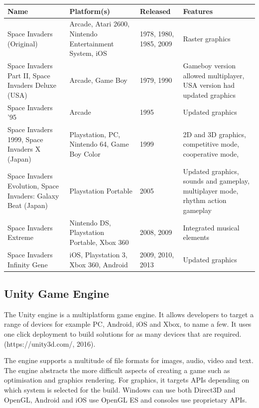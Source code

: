 \documentclass[12pt]{article}
\begin{document}
\begin{center}
    \begin{tabular}{ | p{2.25cm} | p{2.5cm} | p{4.5cm} | p{4cm} |} \hline
    Name & Platform(s) & Released & Features \\ \hline
    Space Invaders (Original) & Arcade, Atari 2600, Nintendo Entertainment System, iOS & 1978, 1980, 1985, 2009 & Raster graphics \\ \hline
    
    Space Invaders Part II, Space Invaders Deluxe (USA) & Arcade, Game Boy & 1979, 1990 & Gameboy version allowed multiplayer, USA version had updated graphics\\ \hline
    
    Space Invaders '95 & Arcade & 1995 & Updated graphics  \\ \hline
    
	Space Invaders 1999, Space Invaders X (Japan) & Playstation, PC, Nintendo 64, Game Boy Color & 1999 & 2D and 3D graphics, competitive mode, cooperative mode,   \\ \hline 
	
	Space Invaders Evolution, Space Invaders: Galaxy Beat (Japan) & Playstation Portable & 2005 & Updated graphics, sounds and gameplay, multiplayer mode, rhythm action gameplay \\ \hline
	
	Space Invaders Extreme & Nintendo DS, Playstation Portable, Xbox 360 & 2008, 2009 & Integrated musical elements \\ \hline
	
	Space Invaders Infinity Gene & iOS, Playstation 3, Xbox 360, Android & 2009, 2010, 2013 & Updated graphics\\ \hline
    \end{tabular}
\end{center}

\newpage
\begin{center}
\subsection{Unity Game Engine}
\end{center}
The Unity engine is a multiplatform game engine. It allows developers to target a range of devices for example PC, Android, iOS and Xbox, to name a few. It uses one click deployment to build solutions for as many devices that are required. (https://unity3d.com/, 2016).

The engine supports a multitude of file formats for images, audio, video and text. The engine abstracts the more difficult aspects of creating a game such as optimisation and graphics rendering. For graphics, it targets APIs depending on which system is selected for the build. Windows can use both Direct3D and OpenGL, Android and iOS use OpenGL ES and consoles use proprietary APIs.
\end{document}
